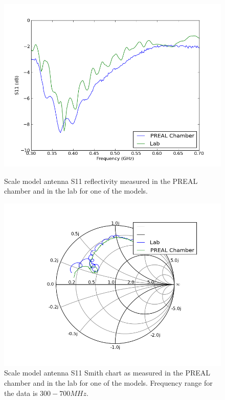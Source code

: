 \begin{figure}[htb]
\centering
\begin{minipage}[b]{0.50\textwidth}
\centering
\includegraphics[width=0.95\linewidth]{SCIHI_system/figures/HIbiscus_S11_model_dB_PREAL.png}
\caption{Scale model antenna S11 reflectivity measured in the PREAL chamber and in the lab for one of the models. }
\label{Fig:HIS11_model_dB}
\end{minipage}%
\begin{minipage}[b]{0.02\textwidth}
\hspace{1cm}
\end{minipage}%
\begin{minipage}[b]{0.46\textwidth}
\centering
\includegraphics[width=0.95\linewidth]{SCIHI_system/figures/HIbiscus_S11_model_Smith_PREAL.png}
\caption{Scale model antenna S11 Smith chart as measured in the PREAL chamber and in the lab for one of the models. Frequency range for the data is $300-700 MHz$.}
\label{Fig:HIS11_model_Smith}
\end{minipage}
\end{figure}

